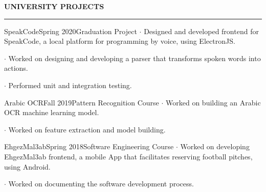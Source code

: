 \noindent\textcolor{themecolor}{\textbf{UNIVERSITY PROJECTS}}

\vspace{2mm}
\hrule
\vspace{3mm}

\begin{verbose}{SpeakCode}{Spring 2020}{Graduation Project}
    \noindent $\cdot$ Designed and developed frontend for SpeakCode, a local platform for programming by voice, using ElectronJS.

    \noindent $\cdot$ Worked on designing and developing a parser that transforms spoken words into actions.

    \noindent $\cdot$ Performed unit and integration testing.
\end{verbose}

\vspace{3mm}

\begin{verbose}{Arabic OCR}{Fall 2019}{Pattern Recognition Course}
    \noindent $\cdot$ Worked on building an Arabic OCR machine learning model.

    \noindent $\cdot$ Worked on feature extraction and model building.
\end{verbose}

\vspace{3mm}

\begin{verbose}{EhgezMal3ab}{Spring 2018}{Software Engineering Course}
    \noindent $\cdot$ Worked on developing EhgezMal3ab frontend, a mobile App that facilitates reserving football pitches, using Android.

    \noindent $\cdot$ Worked on documenting the software development process.
\end{verbose}

